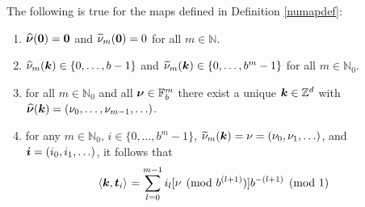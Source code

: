 \documentclass[graybox,footinfo]{svmult}
\newcommand{\Z}{\mathbb{Z}} %
\newcommand{\N}{\mathbb{N}} %
\newcommand{\F}{\mathbb{F}} %
\newcommand{\bszero}{\boldsymbol{0}} %
\newcommand{\bst}{\boldsymbol{t}}    %
\begin{document}
\begin{lemma} \label{numaplem} The following is true for the maps defined in Definition \ref{numapdef}:
\begin{enumerate}
\renewcommand{\labelenumi}{\alph{enumi})}

\item $\hbsnu(\bszero)=\bszero$ and $\tnu_m(\bszero) = 0$ for all $m \in \N$.

\item $\widehat{\nu}_m(\boldsymbol{k})\in \{0,\dots,b-1\}$ and $\widetilde{\nu}_m(\boldsymbol{k})\in \{0,\dots,b^m-1\}$ for all $m\in\N_0$.

\item for all $m\in \N_0$ and all $\bsnu \in \F_b^{m}$ there exist a unique $\bsk \in \Z^d$ with $\widehat{\boldsymbol{\nu}}(\boldsymbol{k})=(\nu_0, \ldots, \nu_{m-1}, \ldots)$.

\item for any $m \in \N_0$, $i \in \{0, \ldots, b^m-1\}$,  $\widetilde{\nu}_m(\boldsymbol{k})=\nu=(\nu_0, \nu_1, \ldots)$, and $\boldsymbol{i}=(i_0, i_1, \ldots)$, it follows that
\begin{align} \label{nuwisum}
\begin{split}
\ip{\bsk}{\bst_i} &= \sum_{l=0}^{m-1} i_l [\nu \pmod  {b^{(l+1)}}]  b^{-(l+1)} \pmod 1
\end{split}
\end{align}

\end{enumerate}
\end{lemma}
\end{document}
